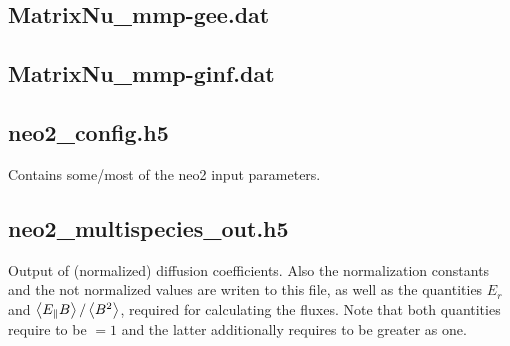 \subsection{MatrixNu\_mmp-gee.dat}

\subsection{MatrixNu\_mmp-ginf.dat}

\subsection{neo2\_config.h5}
Contains some/most of the neo2 input parameters.

\subsection{neo2\_multispecies\_out.h5}
Output of (normalized) diffusion coefficients. Also the normalization
constants and the not normalized values are writen to this file, as well
as the quantities $E_r$ and $\left\langle E_{\parallel} B\right\rangle/\left\langle B^2\right\rangle$,
required for calculating the fluxes.
Note that both quantities require  to be
$=1$ and the latter additionally requires  to be
greater as one.

